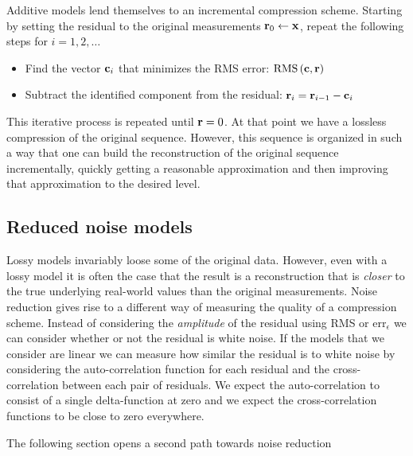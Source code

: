 Additive models lend themselves to an incremental compression
scheme. Starting by setting the residual to the original
measurements $\mathbf{r}_0 \leftarrow \mathbf{x}$, repeat the following steps for
$i=1,2,\ldots$
\begin{itemize}
\item Find the vector $\mathbf{c}_i$ that minimizes the RMS error: 
$\mbox{RMS}\left(\mathbf{c},\mathbf{r} \right)$
\item Subtract the identified component from the residual: $\mathbf{r}_i =
  \mathbf{r}_{i-1}-\mathbf{c}_i$
\end{itemize}
This iterative process is repeated until $\mathbf{r}=0$. At that point we
have a lossless compression of the original sequence. However, this
sequence is organized in such a way that one can build the
reconstruction of the original sequence incrementally, quickly getting
a reasonable approximation and then improving that approximation to
the desired level. 

\subsection{Reduced noise models}
Lossy models invariably loose some of the original
data. However, even with a lossy model it is often the case that the result is a
reconstruction that is {\em closer} to the true underlying real-world
values than the original measurements. 
Noise reduction gives rise to a different way of measuring
the quality of a compression scheme. Instead of considering the {\em
amplitude} of the residual using RMS or $\mbox{err}_{\epsilon}$ we
can consider whether or not the residual is white noise. If the models
that we consider are linear we can measure how similar the residual is
to white noise by considering the auto-correlation function for each
residual and the cross-correlation between each pair of residuals. We
expect the auto-correlation to consist of a single delta-function at
zero and we expect the cross-correlation functions to be close to zero
everywhere.

The following section opens a second path towards noise reduction

\iffalse
This is possible when the model used for compression captures some
inherent regularity in the data. Consider a temperature guage in a
room that is taking a measurement ten times per second. Suppose also
that each measurement is the sum of the true temperature and gaussian
noise with a standard deviation of one degree.  It is clear that
replacing blocks of 10 consecutive measurements by their average is
lossy in terms of the original signal. However, at the same time, the
averaged sequence is closer to the true measurements. This noise
reduction relies of the assumption that room temperature rarely
changes significantly within a tenth of a second. Therefor any rapid
variations in the measured temperature is likely to be an artifact of
the sensor rather than anything real.
\fi



